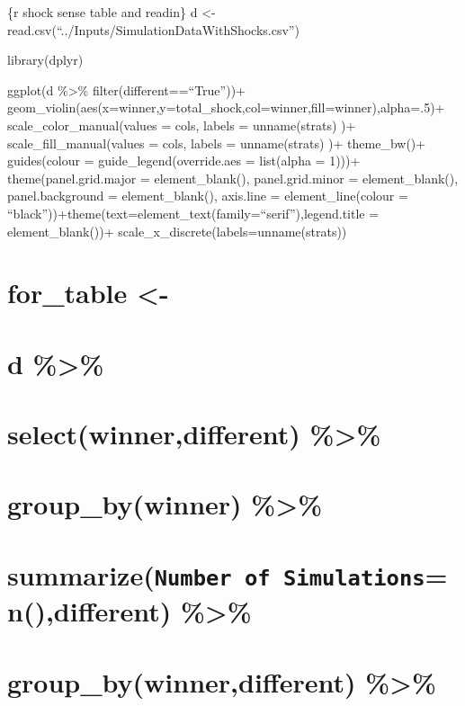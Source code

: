 \documentclass[
]{article}
\begin{document}
\{r shock sense table and readin\} d \textless-
read.csv(``../Inputs/SimulationDataWithShocks.csv'')

library(dplyr)

ggplot(d \%\textgreater\% filter(different==``True''))+
geom\_violin(aes(x=winner,y=total\_shock,col=winner,fill=winner),alpha=.5)+
scale\_color\_manual(values = cols, labels = unname(strats) )+
scale\_fill\_manual(values = cols, labels = unname(strats) )+
theme\_bw()+ guides(colour = guide\_legend(override.aes = list(alpha =
1)))+ theme(panel.grid.major = element\_blank(), panel.grid.minor =
element\_blank(), panel.background = element\_blank(), axis.line =
element\_line(colour =
``black''))+theme(text=element\_text(family=``serif''),legend.title =
element\_blank())+ scale\_x\_discrete(labels=unname(strats))

\hypertarget{for_table--}{%
\section{for\_table \textless-}\label{for_table--}}

\hypertarget{d}{%
\section{d \%\textgreater\%}\label{d}}

\hypertarget{selectwinnerdifferent}{%
\section{select(winner,different)
\%\textgreater\%}\label{selectwinnerdifferent}}

\hypertarget{group_bywinner}{%
\section{group\_by(winner) \%\textgreater\%}\label{group_bywinner}}

\hypertarget{summarizenumber-of-simulationsndifferent}{%
\section{\texorpdfstring{summarize(\texttt{Number\ of\ Simulations}=n(),different)
\%\textgreater\%}{summarize(Number of Simulations=n(),different) \%\textgreater\%}}\label{summarizenumber-of-simulationsndifferent}}

\hypertarget{group_bywinnerdifferent}{%
\section{group\_by(winner,different)
\%\textgreater\%}\label{group_bywinnerdifferent}}
\end{document}

